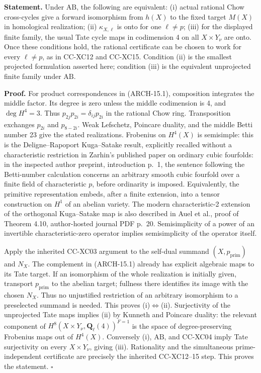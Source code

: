 \textbf{Statement.} Under \(\mathrm{AB}\), the following are equivalent:
(i) actual rational Chow cross-cycles give a forward isomorphism from
\(h(X)\) to the fixed target \(M(X)\) in homological realization;
(ii) \(\kappa_{X,\ell}\) is onto for one \(\ell\ne p\);
(iii) for the displayed finite family, the usual Tate cycle maps in
codimension 4 on all \(X\times Y_\nu\) are onto. Once these conditions
hold, the rational certificate can be chosen to work for every
\(\ell\ne p\), as in CC-XC12 and CC-XC15. Condition (ii) is the smallest
projected formulation asserted here; condition (iii) is the equivalent
unprojected finite family under \(\mathrm{AB}\).

\textbf{Proof.} For product correspondences in (ARCH-15.1), composition
integrates the middle factor. Its degree is zero unless the middle
codimension is 4, and \(\deg H^4=3\). Thus
\(p_{2j}p_{2i}=\delta_{ij}p_{2i}\) in the rational Chow ring.
Transposition exchanges \(p_{2i}\) and \(p_{8-2i}\). Weak Lefschetz,
Poincare duality, and the middle Betti number 23 give the stated
realizations. Frobenius on \(H^4(X)\) is semisimple: this is the
Deligne--Rapoport Kuga--Satake result, explicitly recalled without a
characteristic restriction in Zarhin's published paper on ordinary
cubic fourfolds: in the inspected author preprint, introduction p.~1,
the sentence following the Betti-number calculation concerns an
arbitrary smooth cubic fourfold over a finite field of characteristic
\(p\), before ordinarity is imposed. Equivalently, the primitive
representation embeds, after a finite extension, into a tensor
construction on \(H^1\) of an abelian variety. The modern
characteristic-2 extension of the orthogonal Kuga--Satake map is also
described in Auel et al., proof of Theorem 4.10, author-hosted journal
PDF p.~20. Semisimplicity of a power
of an invertible characteristic-zero operator implies semisimplicity of
the operator itself.

Apply the inherited CC-XC03 argument to the self-dual summand
\((X,p_{\mathrm{prim}})\) and \(N_X\). The complement in (ARCH-15.1)
already has explicit algebraic maps to its Tate target. If an
isomorphism of the whole realization is initially given, transport
\(p_{\mathrm{prim}}\) to the abelian target; fullness there identifies
its image with the chosen \(N_X\). Thus no unjustified restriction of
an arbitrary isomorphism to a preselected summand is needed. This proves
(i)\(\Leftrightarrow\)(ii). Surjectivity of the unprojected Tate maps
implies (ii) by Kunneth and Poincare duality: the relevant component of
\(H^8(X\times Y_\nu,\mathbf Q_\ell(4))^{F=1}\) is the space of
degree-preserving Frobenius maps out of \(H^4(X)\). Conversely (i),
\(\mathrm{AB}\), and CC-XC04 imply Tate surjectivity on every
\(X\times Y_\nu\), giving (iii). Rationality and the simultaneous
prime-independent certificate are precisely the inherited CC-XC12--15
step. This proves the statement. \(\square\)

